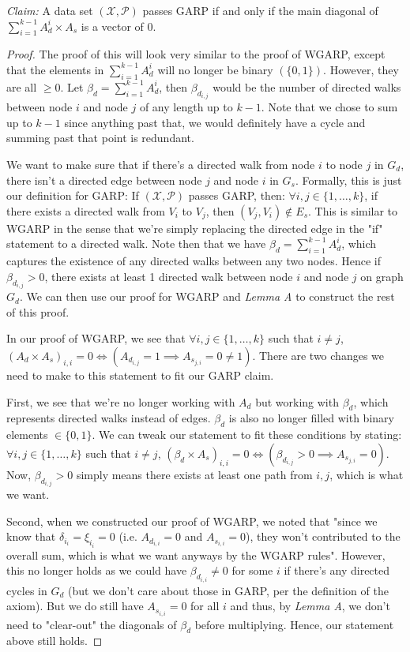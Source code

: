 \documentclass{article} %
\begin{document}
\textit{Claim:} A data set $(\mathcal{X},\mathcal{P})$ passes GARP if and only if the main diagonal of $\sum_{i=1}^{k-1}A_{d}^{i}\times A_s$ is a vector of 0.

\begin{proof}
The proof of this will look very similar to the proof of WGARP, except that the elements in $\sum_{i=1}^{k-1}A_{d}^{i}$ will no longer be binary $(\{0,1\})$. However, they are all $\geq0$. Let $\beta_d=\sum_{i=1}^{k-1}A_{d}^{i}$, then $\beta_{d_{i,j}}$ would be the number of directed walks between node $i$ and node $j$ of any length up to $k-1$. Note that we chose to sum up to $k-1$ since anything past that, we would definitely have a cycle and summing past that point is redundant.


We want to make sure that if there's a directed walk from node $i$ to node $j$ in $G_d$, there isn't a directed edge between node $j$ and node $i$ in $G_s$. Formally, this is just our definition for GARP: If $(\mathcal{X},\mathcal{P})$ passes GARP, then: $\forall i,j\in\{1,\dots,k\}$, if there exists a directed walk from $V_i$ to $V_j$, then $(V_j,V_i)\not\in E_s$. This is similar to WGARP in the sense that we're simply replacing the directed edge in the "if" statement to a directed walk. Note then that we have $\beta_d=\sum_{i=1}^{k-1}A_{d}^{i}$, which captures the existence of any directed walks between any two nodes. Hence if $\beta_{d_{i,j}}>0$, there exists at least 1 directed walk between node $i$ and node $j$ on graph $G_d$. We can then use our proof for WGARP and \textit{Lemma A} to construct the rest of this proof.


In our proof of WGARP, we see that $\forall i, j\in\{1,\ldots,k\}$ such that $i\not=j$, $(A_d\times A_s)_{i,i}=0 \iff (A_{d_{i,j}}=1 \implies A_{s_{j,i}}=0\not=1)$. There are two changes we need to make to this statement to fit our GARP claim. 

First, we see that we're no longer working with $A_d$ but working with $\beta_d$, which represents directed walks instead of edges. $\beta_d$ is also no longer filled with binary elements $\in\{0,1\}$. We can tweak our statement to fit these conditions by stating: $\forall i, j\in\{1,\ldots,k\}$ such that $i\not=j$, $(\beta_d\times A_s)_{i,i}=0 \iff (\beta_{d_{i,j}}>0 \implies A_{s_{j,i}}=0)$. Now, $\beta_{d_{i,j}}>0$ simply means there exists at least one path from $i,j$, which is what we want.

Second, when we constructed our proof of WGARP, we noted that "since we know that $\delta_{i_i}=\xi_{i_i}=0$ (i.e. $A_{d_{i,i}}=0$ and $A_{s_{i,i}}=0$), they won't contributed to the overall sum, which is what we want anyways by the WGARP rules". However, this no longer holds as we could have $\beta_{d_{i,i}}\not=0$ for some $i$ if there's any directed cycles in $G_d$ (but we don't care about those in GARP, per the definition of the axiom). But we do still have $A_{s_{i,i}}=0$ for all $i$ and thus, by \textit{Lemma A}, we don't need to "clear-out" the diagonals of $\beta_d$ before multiplying. Hence, our statement above still holds. 


\end{proof}
\end{document}
